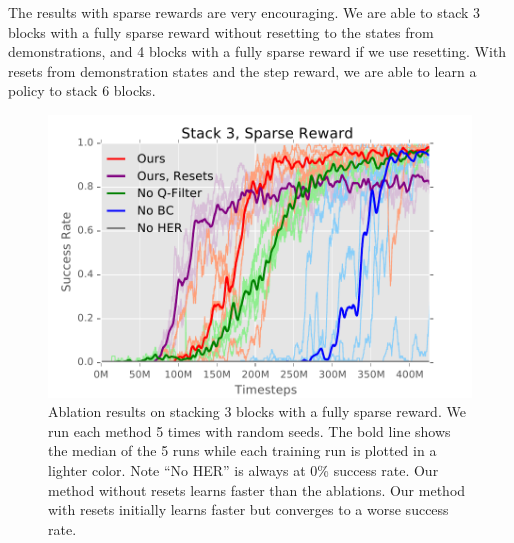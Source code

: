 The results with sparse rewards are very encouraging. We are able to stack 3 blocks with a fully sparse reward without resetting to the states from demonstrations, and 4 blocks with a fully sparse reward if we use resetting. With resets from demonstration states and the step reward, we are able to learn a policy to stack 6 blocks. 

\begin{figure}[t]%
    \vspace{6pt}
    \centering
    \includegraphics[width=0.6\linewidth]{bcddpg/figs/3}
    \caption{Ablation results on stacking 3 blocks with a fully sparse reward. We run each method 5 times with random seeds. The bold line shows the median of the 5 runs while each training run is plotted in a lighter color. Note ``No HER'' is always at 0\% success rate. Our method without resets learns faster than the ablations. Our method with resets initially learns faster but converges to a worse success rate. }%
    \label{fig:ablation3stack}%
\end{figure}


